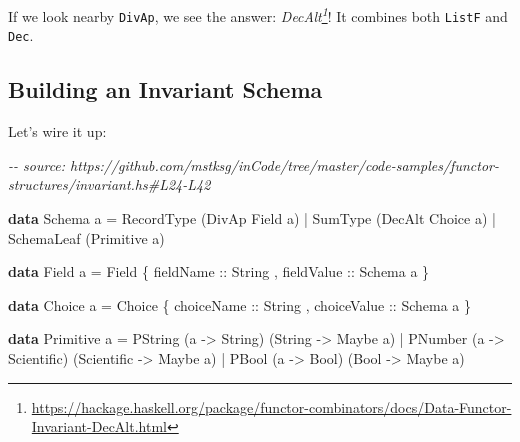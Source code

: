 \documentclass[]{article}
\newenvironment{Shaded}{}{}
\newcommand{\CommentTok}[1]{\textcolor[rgb]{0.38,0.63,0.69}{\textit{#1}}}
\newcommand{\DataTypeTok}[1]{\textcolor[rgb]{0.56,0.13,0.00}{#1}}
\newcommand{\KeywordTok}[1]{\textcolor[rgb]{0.00,0.44,0.13}{\textbf{#1}}}
\newcommand{\NormalTok}[1]{#1}
\newcommand{\OperatorTok}[1]{\textcolor[rgb]{0.40,0.40,0.40}{#1}}
\newcommand{\OtherTok}[1]{\textcolor[rgb]{0.00,0.44,0.13}{#1}}
\renewcommand{\href}[2]{#2\footnote{\url{#1}}}
\begin{document}
If we look nearby \texttt{DivAp}, we see the answer:
\emph{\href{https://hackage.haskell.org/package/functor-combinators/docs/Data-Functor-Invariant-DecAlt.html}{DecAlt}}!
It combines both \texttt{ListF} and \texttt{Dec}.

\subsection{Building an Invariant Schema}\label{building-an-invariant-schema}

Let's wire it up:

\begin{Shaded}
\begin{Highlighting}[]
\CommentTok{{-}{-} source: https://github.com/mstksg/inCode/tree/master/code{-}samples/functor{-}structures/invariant.hs\#L24{-}L42}

\KeywordTok{data} \DataTypeTok{Schema}\NormalTok{ a }\OtherTok{=}
      \DataTypeTok{RecordType}\NormalTok{  (}\DataTypeTok{DivAp}  \DataTypeTok{Field}\NormalTok{  a)}
    \OperatorTok{|} \DataTypeTok{SumType}\NormalTok{     (}\DataTypeTok{DecAlt} \DataTypeTok{Choice}\NormalTok{ a)}
    \OperatorTok{|} \DataTypeTok{SchemaLeaf}\NormalTok{  (}\DataTypeTok{Primitive}\NormalTok{ a)}

\KeywordTok{data} \DataTypeTok{Field}\NormalTok{ a }\OtherTok{=} \DataTypeTok{Field}
\NormalTok{    \{}\OtherTok{ fieldName  ::} \DataTypeTok{String}
\NormalTok{    ,}\OtherTok{ fieldValue ::} \DataTypeTok{Schema}\NormalTok{ a}
\NormalTok{    \}}

\KeywordTok{data} \DataTypeTok{Choice}\NormalTok{ a }\OtherTok{=} \DataTypeTok{Choice}
\NormalTok{    \{}\OtherTok{ choiceName  ::} \DataTypeTok{String}
\NormalTok{    ,}\OtherTok{ choiceValue ::} \DataTypeTok{Schema}\NormalTok{ a}
\NormalTok{    \}}

\KeywordTok{data} \DataTypeTok{Primitive}\NormalTok{ a }\OtherTok{=}
      \DataTypeTok{PString}\NormalTok{ (a }\OtherTok{{-}\textgreater{}} \DataTypeTok{String}\NormalTok{)     (}\DataTypeTok{String}     \OtherTok{{-}\textgreater{}} \DataTypeTok{Maybe}\NormalTok{ a)}
    \OperatorTok{|} \DataTypeTok{PNumber}\NormalTok{ (a }\OtherTok{{-}\textgreater{}} \DataTypeTok{Scientific}\NormalTok{) (}\DataTypeTok{Scientific} \OtherTok{{-}\textgreater{}} \DataTypeTok{Maybe}\NormalTok{ a)}
    \OperatorTok{|} \DataTypeTok{PBool}\NormalTok{   (a }\OtherTok{{-}\textgreater{}} \DataTypeTok{Bool}\NormalTok{)       (}\DataTypeTok{Bool}       \OtherTok{{-}\textgreater{}} \DataTypeTok{Maybe}\NormalTok{ a)}
\end{Highlighting}
\end{Shaded}
\end{document}
